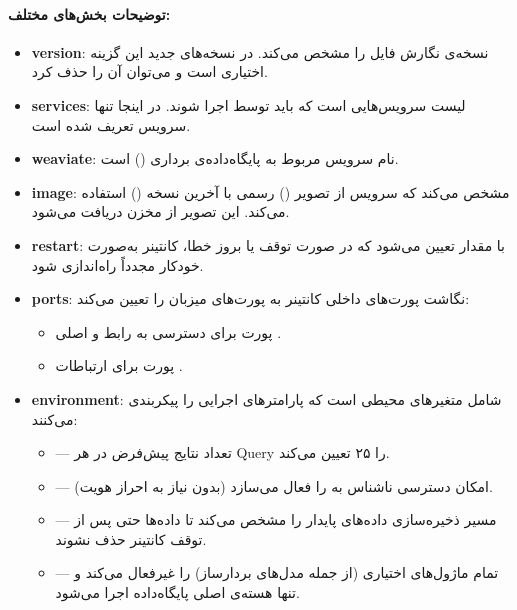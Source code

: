 \documentclass{article}
\begin{document}
\paragraph{توضیحات بخش‌های مختلف:}
\begin{itemize}
    \item \textbf{version}: نسخه‌ی نگارش فایل  را مشخص می‌کند. در نسخه‌های جدید  این گزینه اختیاری است و می‌توان آن را حذف کرد.
    \item \textbf{services}: لیست سرویس‌هایی است که باید توسط  اجرا شوند. در اینجا تنها سرویس  تعریف شده است.
    \item \textbf{weaviate}: نام سرویس مربوط به پایگاه‌داده‌ی برداری () است.
    \item \textbf{image}: مشخص می‌کند که سرویس از تصویر () رسمی  با آخرین نسخه () استفاده می‌کند. این تصویر از مخزن  دریافت می‌شود.
    \item \textbf{restart}: با مقدار  تعیین می‌شود که در صورت توقف یا بروز خطا، کانتینر به‌صورت خودکار مجدداً راه‌اندازی شود.
    \item \textbf{ports}: نگاشت پورت‌های داخلی کانتینر به پورت‌های میزبان را تعیین می‌کند:
    \begin{itemize}
        \item پورت  برای دسترسی به رابط  و  اصلی .
        \item پورت  برای ارتباطات .
    \end{itemize}
    \item \textbf{environment}: شامل متغیرهای محیطی است که پارامترهای اجرایی  را پیکربندی می‌کنند:
    \begin{itemize}
        \item {} — تعداد نتایج پیش‌فرض در هر Query را ۲۵ تعیین می‌کند.
        \item {} — امکان دسترسی ناشناس به  را فعال می‌سازد (بدون نیاز به احراز هویت).
        \item {} — مسیر ذخیره‌سازی داده‌های پایدار را مشخص می‌کند تا داده‌ها حتی پس از توقف کانتینر حذف نشوند.
        \item {} — تمام ماژول‌های اختیاری  (از جمله مدل‌های بردارساز) را غیرفعال می‌کند و تنها هسته‌ی اصلی پایگاه‌داده اجرا می‌شود.
    \end{itemize}
\end{itemize}
\end{document}
